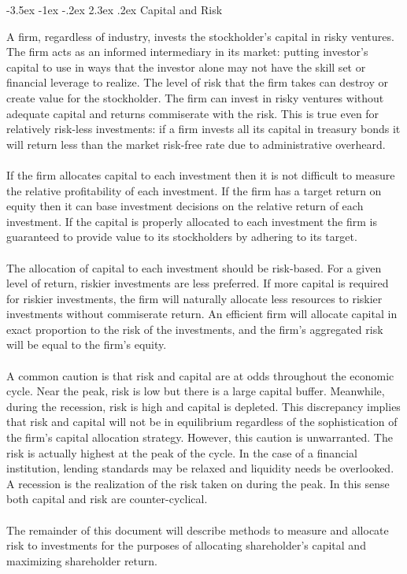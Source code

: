 \documentclass[12pt]{article}
\makeatletter
\theoremstyle{definition}
\renewcommand\section{\@startsection{section}{1}{\z@}%
                                  {-3.5ex \@plus -1ex \@minus -.2ex}%
                                  {2.3ex \@plus.2ex}%
                                  {\normalfont\large\bfseries}}
\makeatother
\begin{document}
\section{Capital and Risk}

A firm, regardless of industry, invests the stockholder's capital in risky ventures.  The firm acts as an informed intermediary in its market: putting investor's capital to use in ways that the investor alone may not have the skill set or financial leverage to realize.  The level of risk that the firm takes can destroy or create value for the stockholder. The firm can invest in risky ventures without adequate capital and returns commiserate with the risk.  This is true even for relatively risk-less investments: if a firm invests all its capital in treasury bonds it will return less than the market risk-free rate due to administrative overheard.  
\\
\\
If the firm allocates capital to each investment then it is not difficult to measure the relative profitability of each investment.  If the firm has a target return on equity then it can base investment decisions on the relative return of each investment.  If the capital is properly allocated to each investment the firm is guaranteed to provide value to its stockholders by adhering to its target.  
\\
\\
The allocation of capital to each investment should be risk-based.  For a given level of return, riskier investments are less preferred.  If more capital is required for riskier investments, the firm will naturally allocate less resources to riskier investments without commiserate return.  An efficient firm will allocate capital in exact proportion to the risk of the investments, and the firm's aggregated risk will be equal to the firm's equity.  
\\
\\
A common caution is that risk and capital are at odds throughout the economic cycle.  Near the peak, risk is low but there is a large capital buffer.  Meanwhile, during the recession, risk is high and capital is depleted.  This discrepancy implies that risk and capital will not be in equilibrium regardless of the sophistication of the firm's capital allocation strategy.  However, this caution is unwarranted.  The risk is actually highest at the peak of the cycle.  In the case of a financial institution, lending standards may be relaxed and liquidity needs be overlooked.  A recession is the realization of the risk taken on during the peak.  In this sense both capital and risk are counter-cyclical.
\\
\\
The remainder of this document will describe methods to measure and allocate risk to investments for the purposes of allocating shareholder's capital and maximizing shareholder return.
\end{document}
